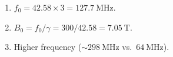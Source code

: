 \begin{enumerate}[leftmargin=1.6em,itemsep=2pt]
\item $f_0 = 42.58\times3 = 127.7\ \text{MHz}$.
\item $B_0 = f_0/\gamma = 300/42.58 = 7.05\ \text{T}$.
\item Higher frequency ($\sim298\ \text{MHz}$ vs.\ $64\ \text{MHz}$).
\end{enumerate}

